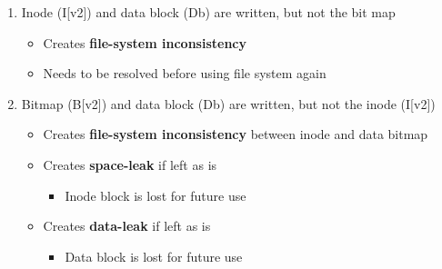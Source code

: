 \documentclass[12pt]{article}
\begin{document}
\begin{itemize}
\begin{enumerate}[1)]
        \bigskip

        \item Inode (I[v2]) and data block (Db) are written, but not the bit map

        \bigskip

        \begin{itemize}
            \item Creates \textbf{file-system inconsistency}
            \item Needs to be resolved before using file system again
        \end{itemize}

        \bigskip

        \item Bitmap (B[v2]) and data block (Db) are written, but not the inode (I[v2])

        \bigskip

        \begin{itemize}
            \item Creates \textbf{file-system inconsistency} between inode and data bitmap
            \item Creates \textbf{space-leak} if left as is
            \begin{itemize}
                \item Inode block is lost for future use
            \end{itemize}
            \item Creates \textbf{data-leak} if left as is

            \begin{itemize}
                \item Data block is lost for future use
            \end{itemize}
        \end{itemize}

        \bigskip
    \end{enumerate}
\end{itemize}
\end{document}
